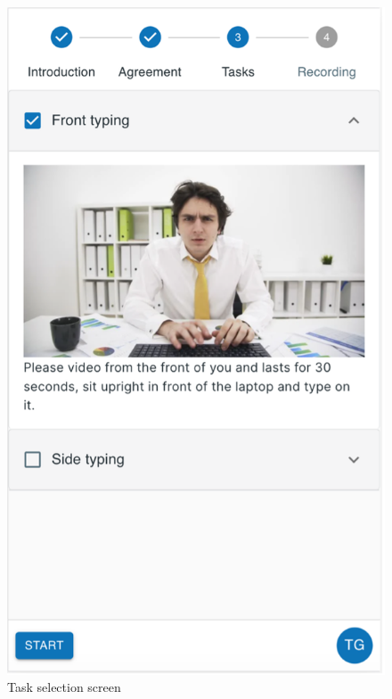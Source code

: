 \begin{minipage}{.5\textwidth}
\begin{figure}[H]
    \centering
    \includegraphics[width=\textwidth]{appendix/imgs/web-task-selection.png}
    \caption{Task selection screen}
    \label{fig:web-task-selection}
\end{figure}
\end{minipage}
